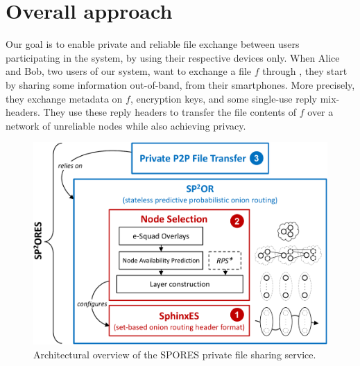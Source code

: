 \section{Overall approach}%
\label{approach}
Our goal is to enable private and reliable file exchange between users 
participating in the system, by using their respective devices only.
When Alice and Bob, two users of our system, want to exchange a file \(f\) 
through \name, they start by sharing some information out-of-band, \eg from 
their smartphones.
More precisely, they exchange metadata on \(f\), encryption keys, and
some single-use reply mix-headers.
They use these reply headers to transfer the file contents of \(f\) over a 
network of unreliable nodes while also achieving privacy.


\begin{figure}[t]
  \centering
  \def\svgwidth{0.8\columnwidth}
    \includegraphics[width=\columnwidth]{figures/OverviewSPORES_cropped}
    \caption{Architectural overview of the \ac{SPORES} private file sharing service.}
    \label{fig:outline}
\end{figure}

